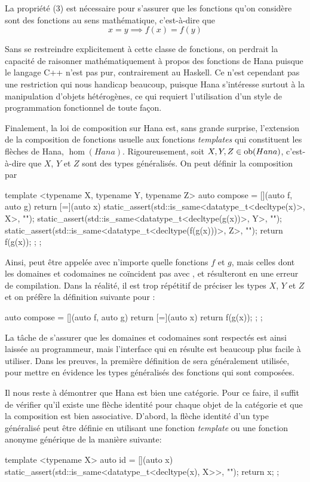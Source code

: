 La propriété (3) est nécessaire pour s'assurer que les fonctions qu'on
considère sont des fonctions au sens mathématique, c'est-à-dire que
\[
    x = y \implies f(x) = f(y)
\]

Sans se restreindre explicitement à cette classe de fonctions, on perdrait la
capacité de raisonner mathématiquement à propos des fonctions de Hana puisque
le langage C++ n'est pas pur, contrairement au Haskell. Ce n'est cependant pas
une restriction qui nous handicap beaucoup, puisque Hana s'intéresse surtout à
la manipulation d'objets hétérogènes, ce qui requiert l'utilisation d'un style
de programmation fonctionnel de toute façon.

Finalement, la loi de composition sur Hana est, sans grande surprise,
l'extension de la composition de fonctions usuelle aux fonctions
\textit{templates} qui constituent les flèches de Hana, $\hom(Hana)$.
Rigoureusement, soit $X, Y, Z \in \mathrm{ob}(Hana)$, c'est-à-dire que $X$, $Y$ et
$Z$ sont des types généralisés. On peut définir la composition par
\begin{cpp}
    template <typename X, typename Y, typename Z>
    auto compose = [](auto f, auto g) {
        return [=](auto x) {
            static_assert(std::is_same<datatype_t<decltype(x)>, X>{}, "");
            static_assert(std::is_same<datatype_t<decltype(g(x))>, Y>{}, "");
            static_assert(std::is_same<datatype_t<decltype(f(g(x)))>, Z>{}, "");
            return f(g(x));
        };
    };
\end{cpp}

Ainsi,  peut être appelée avec n'importe quelle fonctions
$f$ et $g$, mais celles dont les domaines et codomaines ne coïncident pas
avec ,  et  résulteront en une erreur de compilation.
Dans la réalité, il est trop répétitif de préciser les types $X$, $Y$ et $Z$
et on préfère la définition suivante pour :
\begin{cpp}
    auto compose = [](auto f, auto g) {
        return [=](auto x) {
            return f(g(x));
        };
    };
\end{cpp}

La tâche de s'assurer que les domaines et codomaines sont respectés est ainsi
laissée au programmeur, mais l'interface qui en résulte est beaucoup plus
facile à utiliser. Dans les preuves, la première définition de 
sera généralement utilisée, pour mettre en évidence les types généralisés des
fonctions qui sont composées.

Il nous reste à démontrer que Hana est bien une catégorie. Pour ce faire,
il suffit de vérifier qu'il existe une flèche identité pour chaque objet de
la catégorie et que la composition est bien associative. D'abord, la flèche
identité d'un type généralisé peut être définie en utilisant une fonction
\textit{template} ou une fonction anonyme générique de la manière suivante:
\begin{cpp}
    template <typename X>
    auto id = [](auto x) {
        static_assert(std::is_same<datatype_t<decltype(x), X>>{}, "");
        return x;
    };
\end{cpp}

